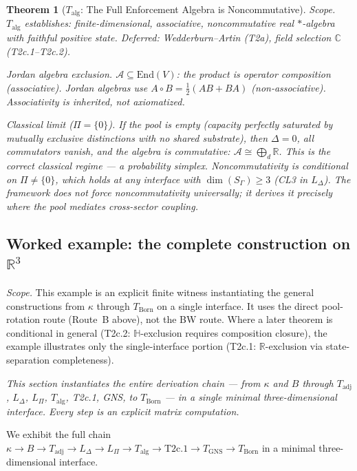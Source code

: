 \documentclass[11pt,a4paper]{article}
\newtheorem{theorem}{Theorem}[section]
\theoremstyle{definition}
\newcommand{\End}{\mathrm{End}}
\begin{document}
\begin{theorem}[$T_{\mathrm{alg}}$: The Full Enforcement Algebra is Noncommutative]
\noindent\textit{Scope.}  $T_{\mathrm{alg}}$ establishes: finite-dimensional, associative, noncommutative real $*$-algebra with faithful positive state.  Deferred: Wedderburn--Artin (T2a), field selection $\mathbb{C}$ (T2c.1--T2c.2).

\noindent\textit{Jordan algebra exclusion.}  $\mathcal{A} \subseteq \End(V)$: the product is operator composition (associative).  Jordan algebras use $A \circ B = \frac{1}{2}(AB+BA)$ (non-associative).  Associativity is inherited, not axiomatized.

\noindent\textit{Classical limit ($\Pi = \{0\}$).}  If the pool is empty (capacity perfectly saturated by mutually exclusive distinctions with no shared substrate), then $\Delta = 0$, all commutators vanish, and the algebra is commutative: $\mathcal{A} \cong \bigoplus_d \mathbb{R}$.  This is the correct classical regime --- a probability simplex.  Noncommutativity is \emph{conditional} on $\Pi \ne \{0\}$, which holds at any interface with $\dim(S_\Gamma) \ge 3$ (CL3 in $L_\Delta$).  The framework does not force noncommutativity universally; it derives it precisely where the pool mediates cross-sector coupling.
\end{theorem}

\subsection{Worked example: the complete construction on $\mathbb{R}^3$}\label{sec:worked}

\noindent\textit{Scope.}  This example is an explicit finite witness instantiating the general constructions from $\kappa$ through $T_{\mathrm{Born}}$ on a single interface.  It uses the direct pool-rotation route (Route~B above), not the BW route.  Where a later theorem is conditional in general (T2c.2: $\mathbb{H}$-exclusion requires composition closure), the example illustrates only the single-interface portion (T2c.1: $\mathbb{R}$-exclusion via state-separation completeness).

\noindent\textit{This section instantiates the entire derivation chain --- from $\kappa$ and $B$ through $T_{\mathrm{adj}}$, $L_\Delta$, $L_\Pi$, $T_{\mathrm{alg}}$, T2c.1, GNS, to $T_{\mathrm{Born}}$ --- in a single minimal three-dimensional interface.  Every step is an explicit matrix computation.}

\smallskip
We exhibit the full chain $\kappa \to B \to T_{\mathrm{adj}} \to L_\Delta \to L_\Pi \to T_{\mathrm{alg}} \to \text{T2c.1} \to T_{\mathrm{GNS}} \to T_{\mathrm{Born}}$ in a minimal three-dimensional interface.
\end{document}

